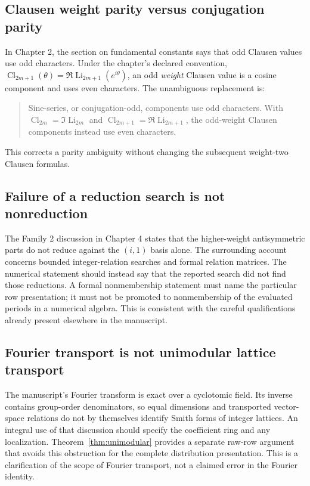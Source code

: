 \documentclass[11pt]{article}
\numberwithin{equation}{section}
\theoremstyle{definition}
\theoremstyle{remark}
\DeclareMathOperator{\Li}{Li}
\DeclareMathOperator{\Cl}{Cl}
\begin{document}
\subsection{Clausen weight parity versus conjugation parity}
In Chapter 2, the section on fundamental constants says that odd Clausen
values use odd characters. Under the chapter's declared convention,
$\Cl_{2m+1}(\theta)=\Re\Li_{2m+1}(e^{i\theta})$, an odd \emph{weight}
Clausen value is a cosine component and uses even characters. The
unambiguous replacement is:
\begin{quote}
Sine-series, or conjugation-odd, components use odd characters. With
$\Cl_{2m}=\Im\Li_{2m}$ and $\Cl_{2m+1}=\Re\Li_{2m+1}$, the odd-weight
Clausen components instead use even characters.
\end{quote}
This corrects a parity ambiguity without changing the subsequent
weight-two Clausen formulas.

\subsection{Failure of a reduction search is not nonreduction}
The Family 2 discussion in Chapter 4 states that the higher-weight
antisymmetric parts do not reduce against the $(i,1)$ basis alone.
The surrounding account concerns bounded integer-relation searches and
formal relation matrices. The numerical statement should instead say
that the reported search did not find those reductions. A formal
nonmembership statement must name the particular row presentation; it
must not be promoted to nonmembership of the evaluated periods in a
numerical algebra. This is consistent with the careful qualifications
already present elsewhere in the manuscript.

\subsection{Fourier transport is not unimodular lattice transport}
The manuscript's Fourier transform is exact over a cyclotomic field.
Its inverse contains group-order denominators, so equal dimensions and
transported vector-space relations do not by themselves identify Smith
forms of integer lattices. An integral use of that discussion should
specify the coefficient ring and any localization. Theorem~\ref{thm:unimodular}
provides a separate raw-row argument that avoids this obstruction for
the complete distribution presentation. This is a clarification of the
scope of Fourier transport, not a claimed error in the Fourier identity.
\end{document}
